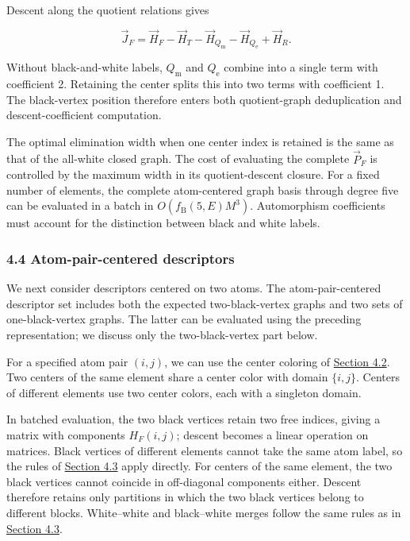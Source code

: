 Descent along the quotient relations gives

\[
\vec J_F=\vec H_F-\vec H_T-\vec H_{Q_{\mathrm m}}-\vec H_{Q_{\mathrm e}}+\vec H_R.
\]

Without black-and-white labels, \(Q_{\mathrm m}\) and \(Q_{\mathrm e}\) combine into a single term with coefficient 2. Retaining the center splits this into two terms with coefficient 1. The black-vertex position therefore enters both quotient-graph deduplication and descent-coefficient computation.

The optimal elimination width when one center index is retained is the same as that of the all-white closed graph. The cost of evaluating the complete \(\vec P_F\) is controlled by the maximum width in its quotient-descent closure. For a fixed number of elements, the complete atom-centered graph basis through degree five can be evaluated in a batch in \(O(f_{\mathrm B}(5,E)M^3)\). Automorphism coefficients must account for the distinction between black and white labels.

\subsubsection{4.4 Atom-pair-centered descriptors}\label{sec:pair-center}

We next consider descriptors centered on two atoms. The atom-pair-centered descriptor set includes both the expected two-black-vertex graphs and two sets of one-black-vertex graphs. The latter can be evaluated using the preceding representation; we discuss only the two-black-vertex part below.

For a specified atom pair \((i,j)\), we can use the center coloring of \hyperref[sec:zero-element-atom-center]{Section 4.2}. Two centers of the same element share a center color with domain \(\{i,j\}\). Centers of different elements use two center colors, each with a singleton domain.

In batched evaluation, the two black vertices retain two free indices, giving a matrix with components \(H_F(i,j)\); descent becomes a linear operation on matrices. Black vertices of different elements cannot take the same atom label, so the rules of \hyperref[sec:atom-center-batch]{Section 4.3} apply directly. For centers of the same element, the two black vertices cannot coincide in off-diagonal components either. Descent therefore retains only partitions in which the two black vertices belong to different blocks. White--white and black--white merges follow the same rules as in \hyperref[sec:atom-center-batch]{Section 4.3}.

